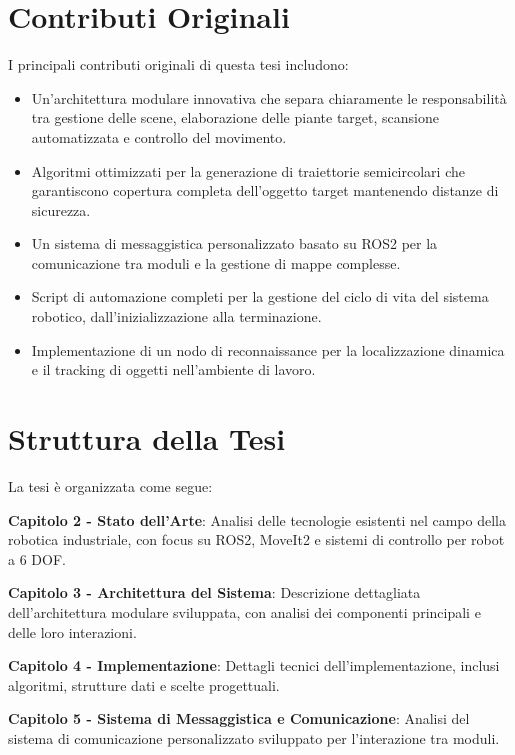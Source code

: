\documentclass[12pt,a4paper,twoside,openright]{book}
\begin{document}
\section{Contributi Originali}

I principali contributi originali di questa tesi includono:

\begin{itemize}
    \item Un'architettura modulare innovativa che separa chiaramente le responsabilità tra gestione delle scene, elaborazione delle piante target, scansione automatizzata e controllo del movimento.
    
    \item Algoritmi ottimizzati per la generazione di traiettorie semicircolari che garantiscono copertura completa dell'oggetto target mantenendo distanze di sicurezza.
    
    \item Un sistema di messaggistica personalizzato basato su ROS2 per la comunicazione tra moduli e la gestione di mappe complesse.
    
    \item Script di automazione completi per la gestione del ciclo di vita del sistema robotico, dall'inizializzazione alla terminazione.
    
    \item Implementazione di un nodo di reconnaissance per la localizzazione dinamica e il tracking di oggetti nell'ambiente di lavoro.
\end{itemize}

\section{Struttura della Tesi}

La tesi è organizzata come segue:

\textbf{Capitolo 2 - Stato dell'Arte}: Analisi delle tecnologie esistenti nel campo della robotica industriale, con focus su ROS2, MoveIt2 e sistemi di controllo per robot a 6 DOF.

\textbf{Capitolo 3 - Architettura del Sistema}: Descrizione dettagliata dell'architettura modulare sviluppata, con analisi dei componenti principali e delle loro interazioni.

\textbf{Capitolo 4 - Implementazione}: Dettagli tecnici dell'implementazione, inclusi algoritmi, strutture dati e scelte progettuali.

\textbf{Capitolo 5 - Sistema di Messaggistica e Comunicazione}: Analisi del sistema di comunicazione personalizzato sviluppato per l'interazione tra moduli.
\end{document}
